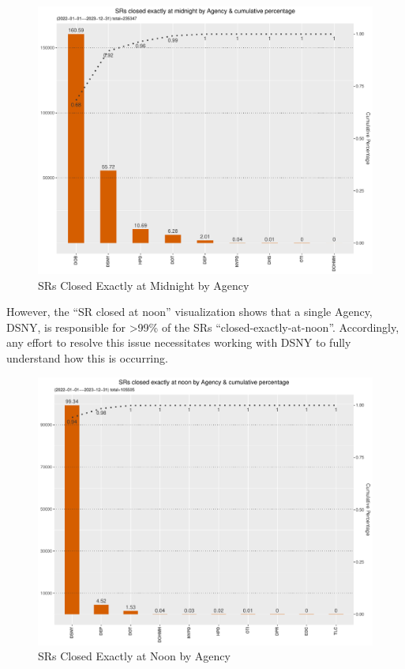 \documentclass[12pt, titlepage]{article}
\begin{document}
	\begin{figure}[tbp]
		\centering
		\includegraphics[width = \textwidth]{closed_at_midnight_chart.pdf}
		\caption{SRs Closed Exactly at Midnight by Agency}
		\label{fig:midnight-closed}
	\end{figure}	

	However, the ``SR closed at noon'' visualization shows that  a single 
	Agency, DSNY, is responsible for \textgreater99\% of the 
	SRs ``closed-exactly-at-noon''. Accordingly, any effort to 
	resolve this issue necessitates working with DSNY to fully understand 
	how this is occurring. 
	
	\begin{figure}[tbp]
		\centering
		\includegraphics[width = \textwidth]
		{closed_at_noon_chart.pdf}
		\caption{SRs Closed Exactly at Noon by Agency}
		\label{fig:noon-closed}
	\end{figure}	
	
\end{document}
